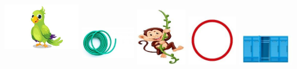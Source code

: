 \includegraphics[width=1.31458in,height=1.32014in]{media/image114.jpg}
\includegraphics[width=0.93056in,height=0.76042in]{media/image115.jpg}
%
\includegraphics[width=0.86956in,height=0.97145in]{media/image116.jpg}
%
\includegraphics[width=0.84722in,height=0.84722in]{media/image117.jpg}
%
\includegraphics[width=0.95347in,height=0.54444in]{media/image118.jpg}
%
